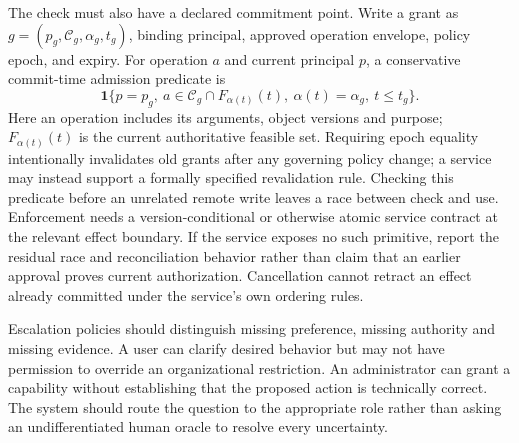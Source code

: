 The check must also have a declared commitment point. Write a grant as $g=(p_g,\mathcal C_g,\alpha_g,t_g)$, binding principal, approved operation envelope, policy epoch, and expiry. For operation $a$ and current principal $p$, a conservative commit-time admission predicate is
\begin{equation}
 \mathbf1\{p=p_g,\ a\in\mathcal C_g\cap F_{\alpha(t)}(t),\
 \alpha(t)=\alpha_g,\ t\leq t_g\}.
\end{equation}
Here an operation includes its arguments, object versions and purpose; $F_{\alpha(t)}(t)$ is the current authoritative feasible set. Requiring epoch equality intentionally invalidates old grants after any governing policy change; a service may instead support a formally specified revalidation rule. Checking this predicate before an unrelated remote write leaves a race between check and use. Enforcement needs a version-conditional or otherwise atomic service contract at the relevant effect boundary. If the service exposes no such primitive, report the residual race and reconciliation behavior rather than claim that an earlier approval proves current authorization. Cancellation cannot retract an effect already committed under the service's own ordering rules.

Escalation policies should distinguish missing preference, missing authority and missing evidence. A user can clarify desired behavior but may not have permission to override an organizational restriction. An administrator can grant a capability without establishing that the proposed action is technically correct. The system should route the question to the appropriate role rather than asking an undifferentiated human oracle to resolve every uncertainty.

